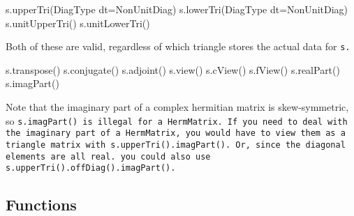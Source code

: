 \begin{tmvcode}
s.upperTri(DiagType dt=NonUnitDiag)
s.lowerTri(DiagType dt=NonUnitDiag)
s.unitUpperTri()
s.unitLowerTri()
\end{tmvcode}
Both of these are valid, regardless
of which triangle stores the actual data for \tt{s}.
\begin{tmvcode}
s.transpose()
s.conjugate()
s.adjoint()
s.view()
s.cView()
s.fView()
s.realPart()
s.imagPart()
\end{tmvcode}
Note that the imaginary part of a complex hermitian matrix is skew-symmetric,
so \tt{s.imagPart()} is illegal for a \tt{HermMatrix}.  If you need to
deal with the imaginary part of a \tt{HermMatrix},
you would have to view them as a triangle matrix with \tt{s.upperTri().imagPart()}.  Or, 
since the diagonal elements are all real.
you could also use \tt{s.upperTri().offDiag().imagPart()}. 
\vspace{12pt}

\subsection{Functions}
\label{SymMatrix_Functions}


